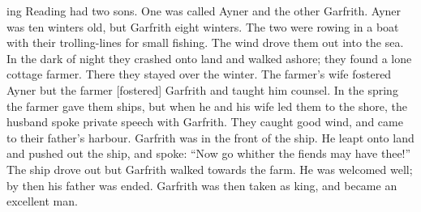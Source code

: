 ing Reading had two sons. One was called Ayner and the other Garfrith.
Ayner was ten winters old, but Garfrith eight winters. The two were rowing in a boat with their trolling-lines for small fishing.
The wind drove them out into the sea. In the dark of night they crashed onto land and walked ashore; they found a lone cottage farmer.
There they stayed over the winter. The farmer’s wife fostered Ayner but the farmer [fostered] Garfrith and taught him counsel.
In the spring the farmer gave them ships, but when he and his wife led them to the shore, the husband spoke private speech with Garfrith.
They caught good wind, and came to their father’s harbour. Garfrith was in the front of the ship.
He leapt onto land and pushed out the ship, and spoke: “Now go whither the fiends may have thee!”
The ship drove out but Garfrith walked towards the farm.  He was welcomed well; by then his father was ended.
Garfrith was then taken as king, and became an excellent man.\epb\epg


